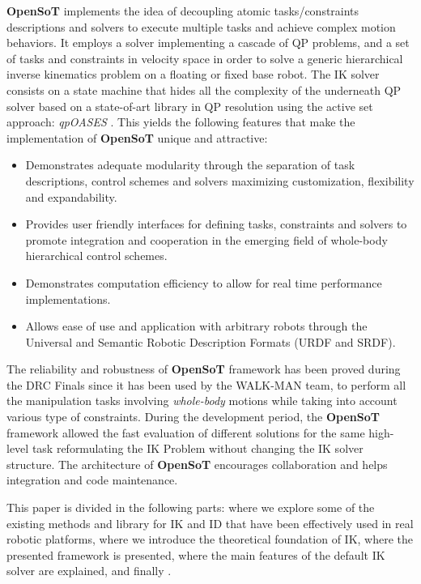 \textbf{OpenSoT} implements the idea of decoupling atomic tasks/constraints descriptions and solvers to execute multiple tasks and achieve complex motion behaviors. It employs a solver implementing a cascade of QP problems, and a set of tasks and constraints in velocity space in order to solve a generic hierarchical inverse kinematics problem on a floating or fixed base robot. The IK solver consists on a state machine that hides all the complexity of the underneath QP solver based on a state-of-art library in QP resolution using the active set approach: \emph{qpOASES} \cite{ferreau2013}.
This yields the following features that make the implementation of \textbf{OpenSoT} unique and attractive:   
\begin{itemize}
\item Demonstrates adequate modularity through the separation of task descriptions, control schemes and solvers maximizing customization, flexibility and expandability.  
\item Provides user friendly interfaces for defining tasks, constraints and solvers to promote integration and cooperation in the emerging field of whole-body hierarchical control schemes.
\item Demonstrates computation efficiency to allow for real time performance implementations.
\item Allows ease of use and application with arbitrary robots through the Universal and Semantic Robotic Description Formats (URDF and SRDF).
\end{itemize}
The reliability and robustness of \textbf{OpenSoT} framework has been proved during the DRC Finals since it has been used by the WALK-MAN team, to perform all the manipulation tasks involving \emph{whole-body} motions while taking into account various type of constraints. During the development period, the \textbf{OpenSoT} framework allowed the fast evaluation of different solutions for the same high-level task reformulating the IK Problem without changing the IK solver structure. 
The architecture of \textbf{OpenSoT} encourages collaboration and helps integration and code maintenance.

This paper is divided in the following parts: \textbf{} where we explore some of the existing methods and library for IK and ID that have been effectively used in real robotic platforms, \textbf{} where we introduce the theoretical foundation of IK, \textbf{} where the presented framework is presented, \textbf{} where the main features of the default IK solver are explained,
and finally \textbf{}.  

